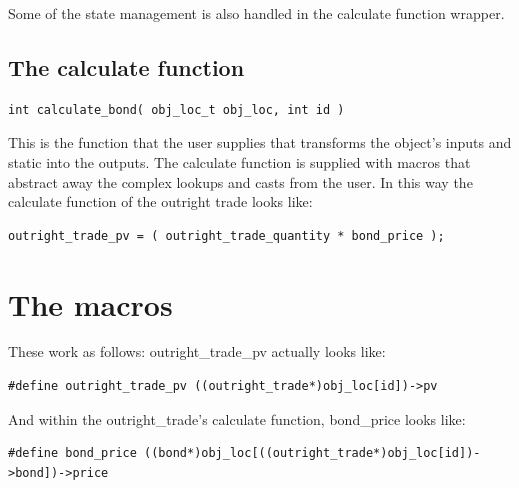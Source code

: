 \documentclass{report}
\begin{document}
Some of the state management is also handled in the calculate function wrapper.

\subsection{The calculate function}

\begin{verbatim}
int calculate_bond( obj_loc_t obj_loc, int id )
\end{verbatim}

This is the function that the user supplies that transforms the object's inputs and static into the outputs.  The calculate function is supplied with macros that abstract away the complex lookups and casts from the user. In this way the calculate function of the outright trade looks like:

\begin{verbatim}
outright_trade_pv = ( outright_trade_quantity * bond_price );
\end{verbatim}


\section{The macros}

These work as follows: outright_trade_pv actually looks like:

\begin{verbatim}
#define outright_trade_pv ((outright_trade*)obj_loc[id])->pv
\end{verbatim}

And within the outright_trade's calculate function, bond_price looks like:

\begin{verbatim}
#define bond_price ((bond*)obj_loc[((outright_trade*)obj_loc[id])->bond])->price
\end{verbatim}
\end{document}
